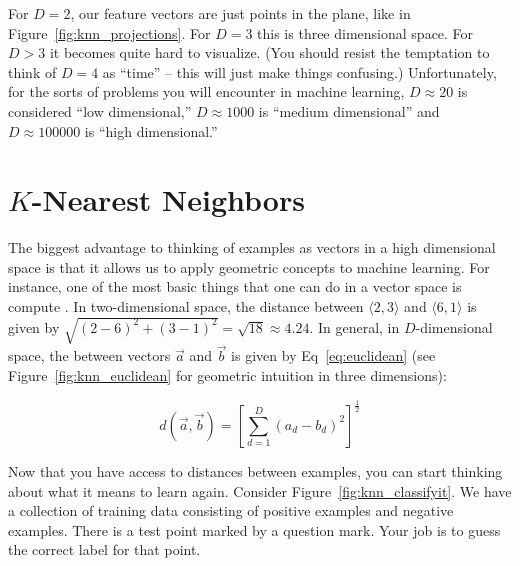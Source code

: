 For $D=2$, our feature vectors are just points in the plane, like in
Figure~\ref{fig:knn_projections}.  For $D=3$ this is three dimensional
space.  For $D>3$ it becomes quite hard to visualize.  (You should
resist the temptation to think of $D=4$ as ``time'' -- this will just
make things confusing.)  Unfortunately, for the sorts of problems you
will encounter in machine learning, $D \approx 20$ is considered ``low
dimensional,'' $D \approx 1000$ is ``medium dimensional'' and $D
\approx 100000$ is ``high dimensional.''


\section[K-Nearest Neighbors]{$K$-Nearest Neighbors}

The biggest advantage to thinking of examples as vectors in a high
dimensional space is that it allows us to apply geometric concepts to
machine learning.  For instance, one of the most basic things that one
can do in a vector space is compute .  In
two-dimensional space, the distance between $\langle 2,3\rangle$ and
$\langle 6,1\rangle$ is given by $\sqrt{(2-6)^2 + (3-1)^2} = \sqrt{18}
\approx 4.24$.  In general, in $D$-dimensional space, the
 between vectors $\vec a$ and $\vec b$ is
given by Eq~\eqref{eq:euclidean} (see Figure~\ref{fig:knn_euclidean}
for geometric intuition in three dimensions):


\begin{equation} \label{eq:euclidean}
d(\vec a, \vec b) = \left[ \sum_{d=1}^D (a_d - b_d)^2 \right]^{\frac 1 2}
\end{equation}



Now that you have access to distances between examples, you can start
thinking about what it means to learn again.  Consider
Figure~\ref{fig:knn_classifyit}.  We have a collection of training
data consisting of positive examples and negative examples.  There is
a test point marked by a question mark.  Your job is to guess the
correct label for that point.

